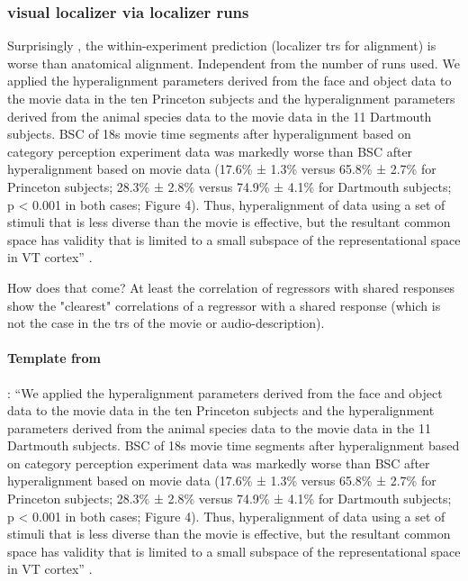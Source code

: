 \subsubsection{visual localizer via localizer runs}


Surprisingly \citep[cf.][]{haxby2011common}, the within-experiment prediction
(localizer \acp{tr} for alignment) is worse than anatomical alignment.
%
Independent from the number of runs used.
%
We applied the hyperalignment parameters derived from the face and object data
to the movie data in the ten Princeton subjects and the hyperalignment
parameters derived from the animal species data to the movie data in the 11
Dartmouth subjects.
%
BSC of 18s movie time segments after hyperalignment based on category perception
experiment data was markedly worse than BSC after hyperalignment based on movie
data (17.6\% ± 1.3\% versus 65.8\% ± 2.7\% for Princeton subjects; 28.3\% ±
2.8\% versus 74.9\% ± 4.1\% for Dartmouth subjects; p < 0.001 in both cases;
Figure 4).
%
Thus, hyperalignment of data using a set of stimuli that is less diverse than
the movie is effective, but the resultant common space has validity that is
limited to a small subspace of the representational space in VT cortex''
\citep{haxby2011common}.

How does that come? At least the correlation of regressors with shared responses
show the "clearest" correlations of a regressor with a shared response (which is
not the case in the \acp{tr} of the movie or audio-description).


\paragraph{Template from \citet{haxby2011common}}:
%
``We applied the hyperalignment parameters derived from the face and object data
to the movie data in the ten Princeton subjects and the hyperalignment
parameters derived from the animal species data to the movie data in the 11
Dartmouth subjects.
%
BSC of 18s movie time segments after hyperalignment based on category perception
experiment data was markedly worse than BSC after hyperalignment based on movie
data (17.6\% ± 1.3\% versus 65.8\% ± 2.7\% for Princeton subjects; 28.3\% ±
2.8\% versus 74.9\% ± 4.1\% for Dartmouth subjects; p < 0.001 in both cases;
Figure 4).
%
Thus, hyperalignment of data using a set of stimuli that is less diverse than
the movie is effective, but the resultant common space has validity that is
limited to a small subspace of the representational space in VT cortex''
\citep{haxby2011common}.


